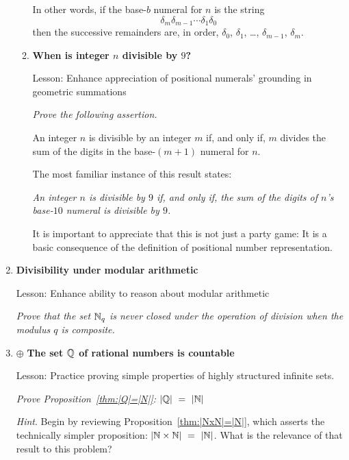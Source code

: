 \begin{enumerate}
\begin{enumerate}
\smallskip

In other words, if the base-$b$ numeral for $n$ is the string
\[ \delta_m \delta_{m-1}  \cdots \delta_1 \delta_0 \]
then the successive remainders are, in order, $\delta_0$, $\delta_1$, \ldots, $\delta_{m-1}$,
$\delta_m$.

   \medskip\item
{\bf When is integer $n$ divisible by $9$?}

{\sc Lesson:} Enhance appreciation of positional numerals' grounding in geometric summations

\smallskip

{\em Prove the following assertion.}

\begin{prop}
An integer $n$ is divisible by an integer $m$ if, and only if, $m$ divides the sum of the digits in the base-$(m+1)$ numeral for $n$.
\end{prop}

\smallskip

The most familiar instance of this result states:

{\it An integer $n$ is divisible by $9$ if, and only if, the sum of the digits of $n$'s base-$10$ numeral is divisible by $9$.}

\smallskip

It is important to appreciate that this is not just a party game: It is a basic consequence of the definition of positional number representation.
   \end{enumerate}

\medskip\item
{\bf Divisibility under modular arithmetic}

{\sc Lesson:} Enhance ability to reason about modular arithmetic

\smallskip

{\em Prove that the set $\mathbb{N}_q$ is {\em never} closed under the operation of division when the modulus $q$ is composite.}


\medskip\item
$\oplus$
{\bf The set $\mathbb{Q}$ of rational numbers is countable}


{\sc Lesson:} Practice proving simple properties of highly structured infinite sets.

\smallskip

{\em Prove Proposition~\ref{thm:|Q|=|N|}: $|\mathbb{Q}| \ = \ |\mathbb{N}|$}

\smallskip

{\em Hint}.  Begin by reviewing Proposition~\ref{thm:|NxN|=|N|}, which asserts the technically simpler proposition: $|\mathbb{N} \times \mathbb{N}| \ = \ |\mathbb{N}|$.  What is the relevance of that result to this problem?

\end{enumerate}

